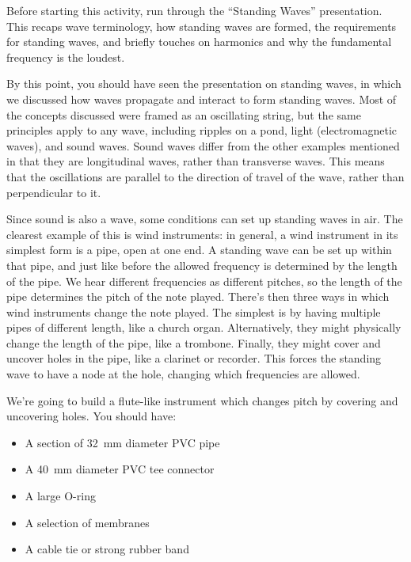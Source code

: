 \documentclass{article}
\begin{document}
\begin{instructoronly}
    Before starting this activity, run through the ``Standing Waves'' presentation. This recaps wave terminology, how standing waves are formed, the requirements for standing waves, and briefly touches on harmonics and why the fundamental frequency is the loudest.
\end{instructoronly}

By this point, you should have seen the presentation on standing waves, in which we discussed how  waves propagate and interact to form standing waves. Most of the concepts discussed were framed as an oscillating string, but the same principles apply to any wave, including ripples on a pond, light (electromagnetic waves), and sound waves. Sound waves differ from the other examples mentioned in that they are longitudinal waves, rather than transverse waves. This means that the oscillations are parallel to the direction of travel of the wave, rather than perpendicular to it. 

Since sound is also a wave, some conditions can set up standing waves in air. The clearest example of this is wind instruments: in general, a wind instrument in its simplest form is a pipe, open at one end. A standing wave can be set up within that pipe, and just like before the allowed frequency is determined by the length of the pipe. We hear different frequencies as different pitches, so the length of the pipe determines the pitch of the note played. There's then three ways in which wind instruments change the note played. The simplest is by having multiple pipes of different length, like a church organ. Alternatively, they might physically change the length of the pipe, like a trombone. Finally, they might cover and uncover holes in the pipe, like a clarinet or recorder. This forces the standing wave to have a node at the hole, changing which frequencies are allowed.


We're going to build a flute-like instrument which changes pitch by covering and uncovering holes. You should have:
\begin{itemize}
    \item A section of \SI{32}{\milli\meter} diameter PVC pipe
    \item A \SI{40}{\milli\meter} diameter PVC tee connector
    \item A large O-ring
    \item A selection of membranes
    \item A cable tie or strong rubber band
\end{itemize}
\end{document}

